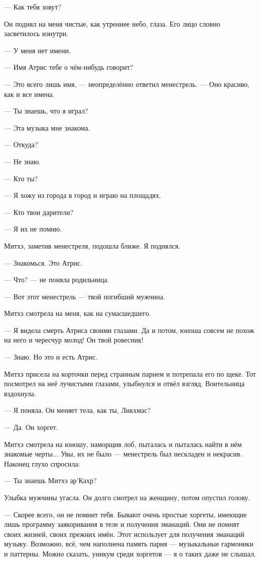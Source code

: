 --- Как тебя зовут?

Он поднял на меня чистые, как утреннее небо, глаза.
Его лицо словно засветилось изнутри.

--- У меня нет имени.

--- Имя Атрис тебе о чём-нибудь говорит?

--- Это всего лишь имя, --- неопределённо ответил менестрель.
--- Оно красиво, как и все имена.

--- Ты знаешь, что я играл?

--- Эта музыка мне знакома.

--- Откуда?

--- Не знаю.

--- Кто ты?

--- Я хожу из города в город и играю на площадях.

--- Кто твои дарители?

--- Я их не помню.

Митхэ, заметив менестреля, подошла ближе.
Я поднялся.

--- Знакомься.
Это Атрис.

--- Что? --- не поняла родильница.

--- Вот этот менестрель --- твой погибший мужчина.

Митхэ смотрела на меня, как на сумасшедшего.

--- Я видела смерть Атриса своими глазами.
Да и потом, юноша совсем не похож на него и чересчур молод!
Он твой ровесник!

--- Знаю.
Но это и есть Атрис.

Митхэ присела на корточки перед странным парнем и потрепала его по щеке.
Тот посмотрел на неё лучистыми глазами, улыбнулся и отвёл взгляд.
Воительница вздохнула.

--- Я поняла.
Он меняет тела, как ты, Ликхмас?

--- Да.
Он хоргет.

Митхэ смотрела на юношу, наморщив лоб, пыталась и пыталась найти в нём знакомые черты...
Увы, их не было --- менестрель был нескладен и некрасив.
Наконец глухо спросила:

--- Ты знаешь Митхэ ар’Кахр?

Улыбка мужчины угасла.
Он долго смотрел на женщину, потом опустил голову.

--- Скорее всего, он не помнит тебя.
Бывают очень простые хоргеты, имеющие лишь программу заякоривания в теле и получения эманаций.
Они не помнят своих жизней, своих прежних имён.
Этот использует для получения эманаций музыку.
Возможно, всё, чем наполнена память парня --- музыкальные гармоники и паттерны.
Можно сказать, уникум среди хоргетов --- я о таких даже не слышал.

